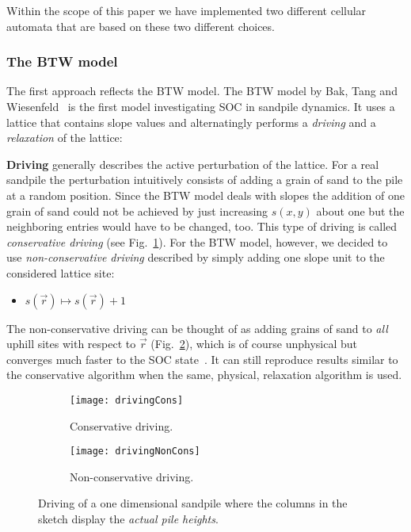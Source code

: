 Within the scope of this paper we have implemented two different cellular automata that are based on these two different
choices.

\subsubsection{The BTW model}
The first approach reflects the BTW model. The BTW model by Bak, Tang and Wiesenfeld~\cite{BakTangWiesenfeld:1987}
is the first model investigating SOC in sandpile dynamics. It uses a lattice that contains slope values and
alternatingly performs a \emph{driving} and a \emph{relaxation} of the lattice:

\textbf{Driving} generally describes the active perturbation of the lattice. For a real sandpile the perturbation
intuitively consists of adding a grain of sand to the pile at a random position. Since the BTW model deals with
slopes the addition of one grain of sand could not be achieved by just increasing $s(x,y)$ about one but the neighboring
entries would have to be changed, too. This type of driving is called \emph{conservative driving}
(see Fig.~\ref{fig:driving:cons}).
For the BTW model, however, we decided to use \emph{non-conservative driving} described by simply adding one slope
unit to the considered lattice site:
\begin{itemize}
\item $s(\vec{r}) \mapsto s(\vec{r})+1$
\end{itemize}
The non-conservative driving can be thought of as adding grains of sand to \emph{all} uphill sites with respect to
$\vec{r}$ (Fig.~\ref{fig:driving:non-cons}), which is of course unphysical but converges much faster to the
SOC state~\cite{Christensen1991}. It can still reproduce results similar to the conservative algorithm when the same,
physical, relaxation algorithm is used.

\begin{figure}[htb]
    \centering
    \begin{subfigure}{0.48\linewidth}
        \texttt{[image: drivingCons]}
        \caption{Conservative driving.}
        \label{fig:driving:cons}
    \end{subfigure}
    \begin{subfigure}{0.48\linewidth}
        \texttt{[image: drivingNonCons]}
        \caption{Non-conservative driving.}
        \label{fig:driving:non-cons}
    \end{subfigure}
    \caption{Driving of a one dimensional sandpile where the columns in the sketch display
             the \emph{actual pile heights}.}
    \label{fig:driving}
\end{figure}

